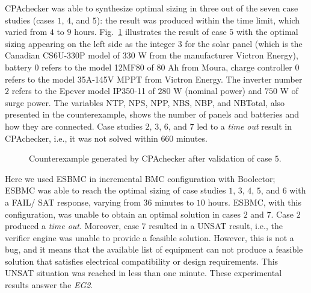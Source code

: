 \documentclass[runningheads]{llncs}
\begin{document}
CPAchecker was able to synthesize optimal sizing in three out of the seven case studies (cases $1$, $4$, and $5$): the result was produced within the time limit, which varied from $4$ to $9$ hours. 
Fig.~\ref{fig:CPAoptc1} illustrates the result of case $5$ with the optimal sizing appearing on the left side as the integer $3$ for the solar panel (which is the Canadian CS6U-330P model of $330$ W from the manufacturer Victron Energy), battery $0$ refers to the model 12MF80 of $80$ Ah from Moura, charge controller $0$ refers to the model 35A-145V MPPT from Victron Energy. The inverter number $2$ refers to the Epever model IP350-11 of $280$ W (nominal power) and $750$ W of surge power. The variables NTP, NPS, NPP, NBS, NBP, and NBTotal, also presented in the counterexample, shows the number of panels and batteries and how they are connected.
Case studies $2$, $3$, $6$, and $7$ led to a \textit{time out} result in CPAchecker, i.e., it was not solved within $660$ minutes.  
%
\begin{figure}[h]
\centering
\caption{Counterexample generated by CPAchecker after validation of case $5$.}
\label{fig:CPAoptc1}
\end{figure}

Here we used ESBMC in incremental BMC configuration with Boolector; ESBMC was able to reach the optimal sizing of case studies $1$, $3$, $4$, $5$, and $6$ with a FAIL/ SAT response, varying from $36$ minutes to $10$ hours. ESBMC, with this configuration, was unable to obtain an optimal solution in cases $2$ and $7$. Case $2$ produced a \textit{time out}. Moreover, case $7$ resulted in a UNSAT result, i.e., the verifier engine was unable to provide a feasible solution. However, this is not a bug, and it means that the available list of equipment can not produce a feasible solution that satisfies electrical compatibility or design requirements. This UNSAT situation was reached in less than one minute. These experimental results answer the \textit{EG2}.
\end{document}
